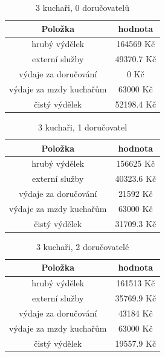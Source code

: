 \documentclass[a4paper, 11pt]{article}
\begin{document}
\begin{table}[h]
\centering
\begin{tabular}{cc}
\textbf{Položka} & \textbf{hodnota}                                                                                   \\ \hline
hrubý výdělek & 164569 Kč \\ \hline
externí služby  & 49370.7 Kč \\ \hline
výdaje za doručování &  0 Kč \\ \hline
výdaje za mzdy kuchařům &  63000 Kč \\ \hline
čistý výdělek &  52198.4 Kč
\end{tabular}
\caption{3 kuchaři, 0 doručovatelů}
\label{tab:4}
\end{table}

\begin{table}[h]
\centering
\begin{tabular}{cc}
\textbf{Položka} & \textbf{hodnota}                                                                                   \\ \hline
hrubý výdělek & 156625 Kč \\ \hline
externí služby  & 40323.6 Kč \\ \hline
výdaje za doručování &  21592 Kč \\ \hline
výdaje za mzdy kuchařům &  63000 Kč \\ \hline
čistý výdělek & 31709.3 Kč
\end{tabular}
\caption{3 kuchaři, 1 doručovatel}
\label{tab:5}
\end{table}

\begin{table}[h]
\centering
\begin{tabular}{cc}
\textbf{Položka} & \textbf{hodnota}                                                                                   \\ \hline
hrubý výdělek & 161513 Kč \\ \hline
externí služby  & 35769.9 Kč \\ \hline
výdaje za doručování &  43184 Kč \\ \hline
výdaje za mzdy kuchařům &  63000 Kč \\ \hline
čistý výdělek &  19557.9 Kč \\ \hline
\end{tabular}
\caption{3 kuchaři, 2 doručovatelé}
\label{tab:6}
\end{table}
\end{document}
